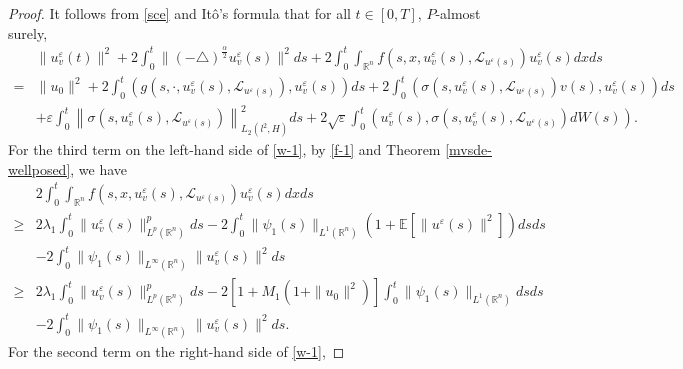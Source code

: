 \documentclass[11pt]{article}
\numberwithin{equation}{section}
\theoremstyle{plain}
\def\geq{\geqslant}
\begin{document}
 \begin{proof}
    It follows from \eqref{sce} and It\^{o}'s formula that for all $t\in[0,T]$, $P$-almost surely,
    \begin{align}\label{w-1}
        & \|u_v^\varepsilon(t)\|^2
        + 2 \int_0^t \|(-\triangle)^{\frac{\alpha}{2}} u_v^\varepsilon (s) \|^2 ds
        + 2 \int_{0}^{t} \int_{\mathbb{R}^n}
        f(s, x, u_v^\varepsilon (s), \mathcal{L}_{u^\varepsilon(s)} )  u_v^\varepsilon (s)
        dx ds
        \nonumber \\
        = & \| u_0 \|^2
        + 2 \int_{0}^{t}
        \left( g(s, \cdot, u_v^\varepsilon (s), \mathcal{L}_{u^\varepsilon(s)} ), u_v^\varepsilon (s) \right) ds
        + 2 \int_{0}^{t}
        \left( \sigma(s, u_v^\varepsilon (s), \mathcal{L}_{u^\varepsilon(s)} ) v(s),
        u_v^\varepsilon (s)
        \right) ds
        \nonumber \\
        & + \varepsilon \int_{0}^{t}
        \left\| \sigma(s, u_v^\varepsilon (s), \mathcal{L}_{u^\varepsilon(s)} )
        \right\|^2_{L_2(l^2, H)} ds
        + 2 \sqrt{\varepsilon} \int_{0}^{t}
        \left( u_v^\varepsilon (s), \sigma(s, u_v^\varepsilon (s), \mathcal{L}_{u^\varepsilon(s)} ) dW(s) \right).
    \end{align}
    For the third term on the left-hand side of \eqref{w-1},
    by \eqref{f-1} and Theorem \ref{mvsde-wellposed}, we have
    \begin{align}\label{w-2}
        & 2 \int_{0}^{t} \int_{\mathbb{R}^n}
        f(s, x, u_v^\varepsilon (s), \mathcal{L}_{u^\varepsilon(s)} )  u_v^\varepsilon (s)
        dx ds  \nonumber \\
        \geq &
        2 \lambda_1 \int_{0}^{t} \| u_v^\varepsilon(s) \|_{L^p(\mathbb{R}^n)}^{p} ds
        - 2 \int_{0}^{t} \| \psi_1(s) \|_{L^1(\mathbb{R}^n)} \left( 1 + \mathbb{E}\left[\|u^\varepsilon(s)\|^2\right] \right) ds
        ds\nonumber \\
        & - 2 \int_{0}^{t} \| \psi_1(s) \|_{L^\infty
            (\mathbb{R}^n)}    \| u_v^\varepsilon(s) \|^2  ds
        \nonumber \\
        \geq & 2 \lambda_1 \int_{0}^{t} \| u_v^\varepsilon(s) \|_{L^p(\mathbb{R}^n)}^{p} ds
        - 2 \left[ 1 + M_1( 1 + \|u_0\|^2 ) \right] \int_{0}^{t} \| \psi_1(s) \|_{L^1(\mathbb{R}^n)} ds
        ds\nonumber \\
        & - 2 \int_{0}^{t} \| \psi_1(s) \|_{L^\infty
            (\mathbb{R}^n)}    \| u_v^\varepsilon(s) \|^2  ds.
    \end{align}
    For the second term on the right-hand side of \eqref{w-1},

\end{proof}
\end{document}
